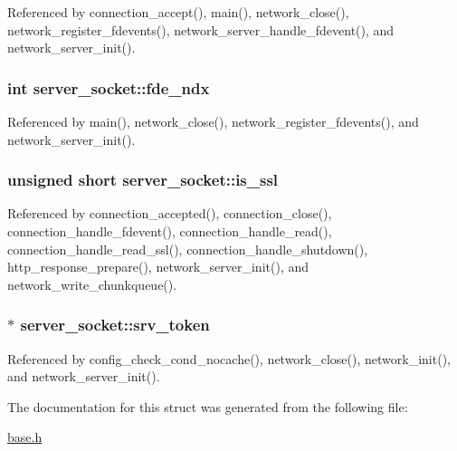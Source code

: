 Referenced by connection\-\_\-accept(), main(), network\-\_\-close(), network\-\_\-register\-\_\-fdevents(), network\-\_\-server\-\_\-handle\-\_\-fdevent(), and network\-\_\-server\-\_\-init().

\hypertarget{structserver__socket_ac2a4c92cdb399017e2e4ae6847975a2e}{
\subsubsection[{fde\-\_\-ndx}]{\setlength{\rightskip}{0pt plus 5cm}int server\-\_\-socket\-::fde\-\_\-ndx}}\label{structserver__socket_ac2a4c92cdb399017e2e4ae6847975a2e}


Referenced by main(), network\-\_\-close(), network\-\_\-register\-\_\-fdevents(), and network\-\_\-server\-\_\-init().

\hypertarget{structserver__socket_a84b0aea1a3f4801bfb2d017e7e608e0e}{
\subsubsection[{is\-\_\-ssl}]{\setlength{\rightskip}{0pt plus 5cm}unsigned short server\-\_\-socket\-::is\-\_\-ssl}}\label{structserver__socket_a84b0aea1a3f4801bfb2d017e7e608e0e}


Referenced by connection\-\_\-accepted(), connection\-\_\-close(), connection\-\_\-handle\-\_\-fdevent(), connection\-\_\-handle\-\_\-read(), connection\-\_\-handle\-\_\-read\-\_\-ssl(), connection\-\_\-handle\-\_\-shutdown(), http\-\_\-response\-\_\-prepare(), network\-\_\-server\-\_\-init(), and network\-\_\-write\-\_\-chunkqueue().

\hypertarget{structserver__socket_a39a8f89f90488013461f207dc3e86138}{
\subsubsection[{srv\-\_\-token}]{$\ast$ server\-\_\-socket\-::srv\-\_\-token}}\label{structserver__socket_a39a8f89f90488013461f207dc3e86138}


Referenced by config\-\_\-check\-\_\-cond\-\_\-nocache(), network\-\_\-close(), network\-\_\-init(), and network\-\_\-server\-\_\-init().



The documentation for this struct was generated from the following file\-:\begin{DoxyCompactItemize}
\item 
\hyperlink{base_8h}{base.\-h}\end{DoxyCompactItemize}
